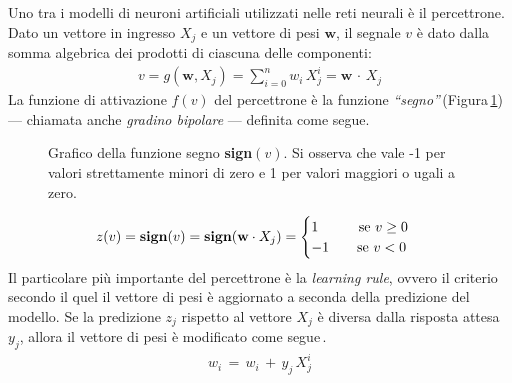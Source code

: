 Uno tra i modelli di neuroni artificiali utilizzati nelle reti neurali è il percettrone. Dato un vettore in ingresso $X_j$ e un vettore di pesi $\mathbf{w}$, il segnale $v$ è dato dalla somma algebrica dei prodotti di ciascuna delle componenti:
% 
\begin{gather*}
    v = g\left(\mathbf{w}, X_j\right) = \sum_{i = 0}^n w_i\,X_j^i = \mathbf{w} \, \cdot \,  X_j
\end{gather*}
% 
\noindent La funzione di attivazione $f(v)$ del percettrone è la funzione \textsl{``segno''}\,(Figura\,\ref{fig:sign-function}) — chiamata anche \textsl{gradino bipolare} — definita come segue. 
% 
\begin{figure}[!t]
    \centering
    
    \caption[Grafico della funzione segno \textsl{sign}$(v)$.]{Grafico della funzione segno \textbf{sign}$(v)$. Si osserva che vale -1 per valori strettamente minori di zero e 1 per valori maggiori o ugali a zero.}\label{fig:sign-function}
\end{figure}
% 
\begin{gather*}
    z(v) = \text{\textbf{sign}}(v) = \text{\textbf{sign}}(\mathbf{w} \cdot X_j) =
    \begin{cases}
        1 \hspace{29px} \text{se } v\geq0\\
        -1 \hspace{20px} \text{se } v<0
    \end{cases}
\end{gather*}
% 
\noindent Il particolare più importante del percettrone è la \textit{learning rule}, ovvero il criterio secondo il quel il vettore di pesi è aggiornato a seconda della predizione del modello. Se la predizione $z_j$ rispetto al vettore $X_j$ è diversa dalla risposta attesa $y_j$, allora il vettore di pesi è modificato come segue\,\cite{nielsen2015neural, flasinski2016introduction}.
% 
\begin{gather*}
    w_i \, = \, w_i \, + \, y_j\,X_j^i
\end{gather*}

